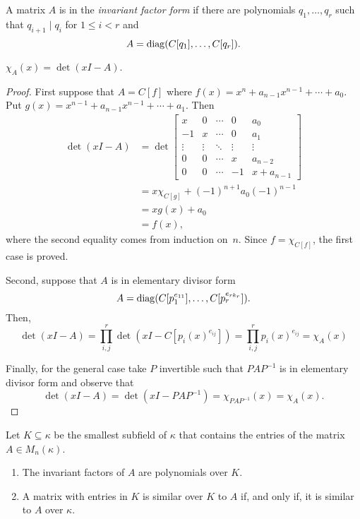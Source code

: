 \begin{defn}
    A matrix $A$ is in the \textsl{invariant factor form} if there are polynomials $q_1,\dots,q_r$ such that $q_{i+1}\mid q_i$ for $1\le i<r$ and
    $$
        A = \operatorname{diag}(C[q_1],\dots,C[q_r]).
    $$
\end{defn}

\begin{thm}
    $\chi_A(x)=\det(xI-A)$.
\end{thm}

\begin{proof}
    First suppose that $A=C[f]$ where $f(x)=x^n+a_{n-1}x^{n-1}+\cdots+a_0$. Put $g(x)=x^{n-1}+a_{n-1}x^{n-1}+\cdots+a_1$. Then
    \begin{align*}
        \det(xI-A) & = \det
            \begin{bmatrix}
                x & 0 & \cdots & 0 & a_0 \\
                -1 & x & \cdots & 0 & a_1 \\
                \vdots&\vdots&\ddots&\vdots&\vdots\\
                0 & 0 & \cdots & x & a_{n-2} \\
                0 & 0 & \cdots & -1 & x + a_{n-1}
            \end{bmatrix}\\
            &=x\chi_{C[g]}+(-1)^{n+1}a_0(-1)^{n-1}\\
            &= xg(x)+a_0\\
            &= f(x),
    \end{align*}
    where the second equality comes from induction on~$n$. Since $f=\chi_{C[f]}$, the first case is proved.

    Second, suppose that $A$ is in elementary divisor form
    $$
        A = \operatorname{diag}(C[p_1^{e_{11}}],\dots,C[p_r^{e_{rk_r}}]).
    $$
    Then,
    $$
        \det(xI-A) = \prod_{i,j}^r\det(xI-C[p_i(x)^{e_{ij}}])
            = \prod_{i,j}^rp_i(x)^{e_{ij}} = \chi_A(x)
    $$

    Finally, for the general case take $P$ invertible such that $PAP^{-1}$ is in elementary divisor form and observe that
    $$
        \det(xI-A) = \det(xI-PAP^{-1})=\chi_{PAP^{-1}}(x)=\chi_A(x).
    $$
\end{proof}

\begin{thm}\label{thm:subfield-similarity}
    Let\/ $K\subseteq\kappa$ be the smallest subfield of\/ $\kappa$ that contains the entries of the matrix\/~$A\in M_n(\kappa)$.
    \begin{enumerate}[\rm a)]
      \item The invariant factors of\/ $A$ are polynomials over\/ $K$.
      \item A matrix with entries in\/ $K$ is similar over\/ $K$ to\/ $A$ if, and only if, it is similar to\/ $A$ over\/ $\kappa$.
    \end{enumerate}
\end{thm}

